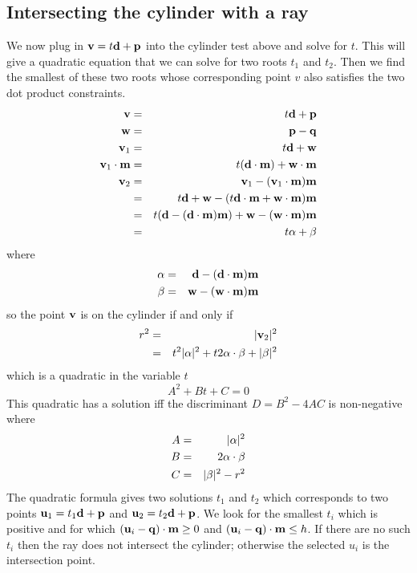 \documentclass{book}
\newcommand{\vect}[1]{{\bf{ #1}}}
\begin{document}
\subsection{Intersecting the cylinder with a ray}
We now plug in ${\vect v} = t {\vect d} + {\vect p}$ into the cylinder test above and
solve for $t$. This will give a quadratic equation that we can solve for two roots $t_1$ and $t_2$.
Then we find the smallest of these two roots whose corresponding point $v$ also satisfies the
two dot product constraints.
\begin{eqnarray*}
{\vect v} &=& t {\vect d} + {\vect p} \\
{\vect w} &=& {\vect p} - {\vect q} \\
{\vect v}_1 &=& t {\vect d} + {\vect w} \\
{\vect v}_1 \cdot {\vect m}  &=& t ({\vect d}\cdot {\vect m}) + {\vect w}\cdot {\vect m} \\
{\vect v}_2 &=& {\vect v}_1 - ({\vect v}_1 \cdot {\vect m}){\vect m} \\
  &=& t {\vect d} + {\vect w}  - (t {\vect d} \cdot {\vect m} + {\vect w}\cdot {\vect m}){\vect m} \\
  &=& t ({\vect d} - ({\vect d} \cdot {\vect m}) {\vect m}) + {\vect w}  - ({\vect w}\cdot {\vect m}){\vect m} \\
 &=& t {\vect \alpha} + {\vect \beta}  \\
\end{eqnarray*}
where
\begin{eqnarray*}
{\vect \alpha}  &=& {\vect d} - ({\vect d} \cdot {\vect m}) {\vect m} \\
{\vect \beta} &=&  {\vect w}  - ({\vect w}\cdot {\vect m}){\vect m}  \\
\end{eqnarray*}
so the point ${\vect v}$ is on the cylinder if and only if
\begin{eqnarray*}
r^2 &=& \vert {\vect v}_2 \vert^2 \\
&=& t^2 \vert {\vect \alpha} \vert^2 + t 2 {\vect \alpha} \cdot {\vect \beta} + \vert {\vect \beta} \vert^2
\end{eqnarray*}
which is a quadratic in the variable $t$
\[
A^2 + Bt + C = 0
\]
This quadratic has a solution iff the discriminant $D = B^2 -4AC$ is non-negative
where
\begin{eqnarray*}
A &=& \vert {\vect \alpha}\vert^2 \\
B &=&  2 {\vect \alpha} \cdot {\vect \beta} \\
C &=& \vert {\vect \beta} \vert^2 - r^2
\end{eqnarray*}
The quadratic formula gives two solutions $t_1$ and $t_2$ which corresponds to
two points ${\vect u}_1 = t_1 {\vect d} + {\vect p}$ and ${\vect u}_2 = t_2 {\vect d} + {\vect p}$.
We look for the smallest $t_i$ which is positive and for which $({\vect u}_i - {\vect q}) \cdot {\vect m} \ge 0$ and
$({\vect u}_i  - {\vect q}) \cdot {\vect m} \le h$. If there are no such $t_i$ then the ray does not intersect the cylinder;
otherwise the selected $u_i$ is the intersection point.
\end{document}
